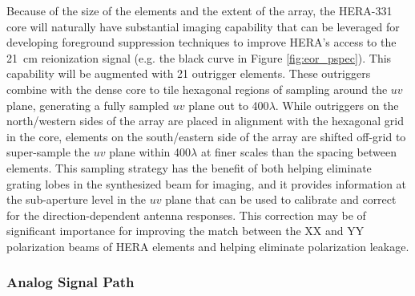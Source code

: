 \documentclass[preprint]{aastex}
\begin{document}
Because of the size of the elements and the extent of the array, the HERA-331 core will naturally have substantial
imaging capability that can be leveraged for developing foreground suppression techniques
to improve HERA's access to the 21~cm reionization signal (e.g. the black curve
in Figure \ref{fig:eor_pspec}).
This capability will be augmented with 21 outrigger elements.  These outriggers
combine with the dense core to tile hexagonal regions of sampling around the $uv$ plane, generating a fully
sampled $uv$ plane out to 400$\lambda$.  While outriggers on the north/western sides of the array are
placed in alignment with the hexagonal grid in the core, elements on the south/eastern side of the array are
shifted off-grid to super-sample the $uv$ plane within 400$\lambda$ at finer scales than the spacing
between elements.  This sampling strategy has the benefit of both helping eliminate grating lobes in the
synthesized beam for imaging, and it provides information at the sub-aperture level in the $uv$ plane that
can be used to calibrate and correct for the direction-dependent antenna responses.  This correction may
be of significant importance for improving the match between the XX and YY polarization beams of HERA elements
and helping eliminate polarization leakage.


\vspace{-0.25in}
\subsubsection{Analog Signal Path}
\vspace{-6pt}
\end{document}
